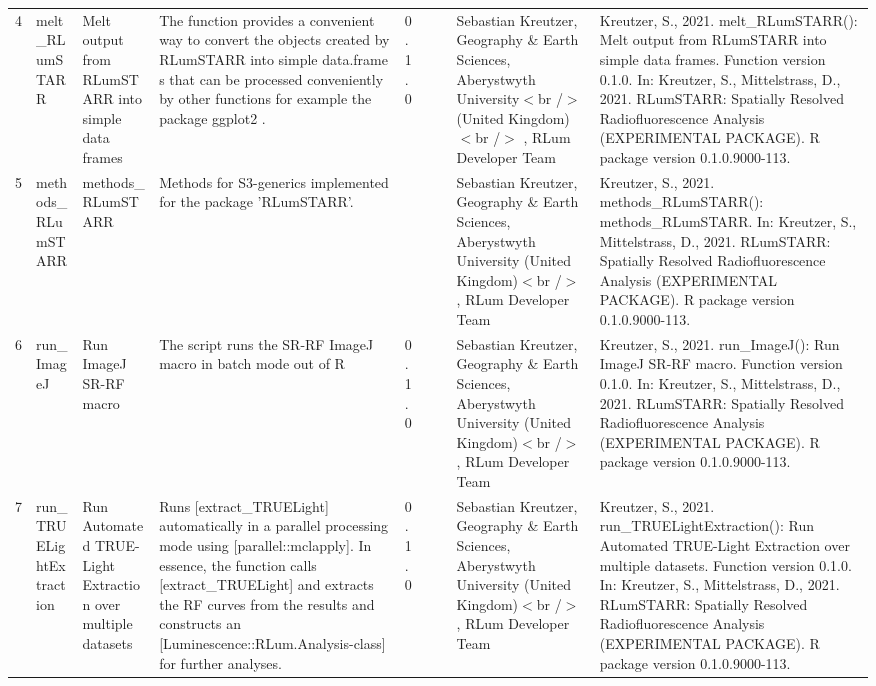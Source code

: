 \begin{table}[ht]
\begin{tabular}{rllllllll}
 \\ 
  4 & melt\_RLumSTARR & Melt output from RLumSTARR into simple data frames & The function provides a convenient way to convert the objects created by RLumSTARR into simple  data.frame s that can be processed conveniently by other functions for example the package  ggplot2 . & 0.1.0
 &  &  & Sebastian Kreutzer, Geography \& Earth Sciences, Aberystwyth University$<$br /$>$ (United Kingdom)$<$br /$>$ , RLum Developer Team & Kreutzer, S., 2021. melt\_RLumSTARR(): Melt output from RLumSTARR into simple data frames. Function version 0.1.0. In: Kreutzer, S., Mittelstrass, D., 2021. RLumSTARR: Spatially Resolved Radiofluorescence Analysis (EXPERIMENTAL PACKAGE). R package version 0.1.0.9000-113. 
 \\ 
  5 & methods\_RLumSTARR & methods\_RLumSTARR & Methods for S3-generics implemented for the package 'RLumSTARR'. &  &  &  & Sebastian Kreutzer, Geography \& Earth Sciences, Aberystwyth University (United Kingdom)$<$br /$>$ , RLum Developer Team & Kreutzer, S., 2021. methods\_RLumSTARR(): methods\_RLumSTARR. In: Kreutzer, S., Mittelstrass, D., 2021. RLumSTARR: Spatially Resolved Radiofluorescence Analysis (EXPERIMENTAL PACKAGE). R package version 0.1.0.9000-113. 
 \\ 
  6 & run\_ImageJ & Run ImageJ SR-RF macro & The script runs the SR-RF ImageJ macro in batch mode out of R & 0.1.0
 &  &  & Sebastian Kreutzer, Geography \& Earth Sciences, Aberystwyth University (United Kingdom)$<$br /$>$ , RLum Developer Team & Kreutzer, S., 2021. run\_ImageJ(): Run ImageJ SR-RF macro. Function version 0.1.0. In: Kreutzer, S., Mittelstrass, D., 2021. RLumSTARR: Spatially Resolved Radiofluorescence Analysis (EXPERIMENTAL PACKAGE). R package version 0.1.0.9000-113. 
 \\ 
  7 & run\_TRUELightExtraction & Run Automated TRUE-Light Extraction over multiple datasets & Runs [extract\_TRUELight] automatically in a parallel processing mode using [parallel::mclapply]. In essence, the function calls [extract\_TRUELight] and extracts the RF curves from the results and constructs an [Luminescence::RLum.Analysis-class] for further analyses. & 0.1.0
 &  &  & Sebastian Kreutzer, Geography \& Earth Sciences, Aberystwyth University (United Kingdom)$<$br /$>$ , RLum Developer Team & Kreutzer, S., 2021. run\_TRUELightExtraction(): Run Automated TRUE-Light Extraction over multiple datasets. Function version 0.1.0. In: Kreutzer, S., Mittelstrass, D., 2021. RLumSTARR: Spatially Resolved Radiofluorescence Analysis (EXPERIMENTAL PACKAGE). R package version 0.1.0.9000-113. 
 \\ 
   \hline
\end{tabular}
\end{table}

